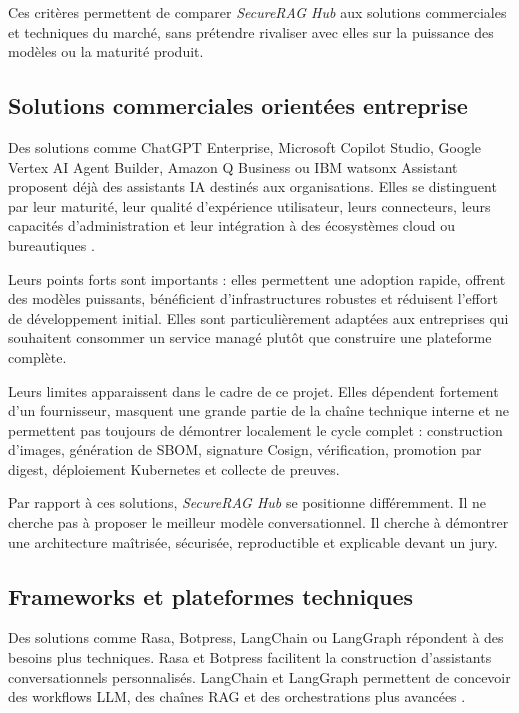 Ces critères permettent de comparer \textit{SecureRAG Hub} aux solutions commerciales et techniques du marché, sans prétendre rivaliser avec elles sur la puissance des modèles ou la maturité produit.

\subsection{Solutions commerciales orientées entreprise}

Des solutions comme ChatGPT Enterprise, Microsoft Copilot Studio, Google Vertex AI Agent Builder, Amazon Q Business ou IBM watsonx Assistant proposent déjà des assistants IA destinés aux organisations. Elles se distinguent par leur maturité, leur qualité d'expérience utilisateur, leurs connecteurs, leurs capacités d'administration et leur intégration à des écosystèmes cloud ou bureautiques \cite{openai_chatgpt_enterprise,microsoft_copilot_studio,google_vertex_ai_agent_builder,aws_q_business,ibm_watsonx_assistant}.

Leurs points forts sont importants : elles permettent une adoption rapide, offrent des modèles puissants, bénéficient d'infrastructures robustes et réduisent l'effort de développement initial. Elles sont particulièrement adaptées aux entreprises qui souhaitent consommer un service managé plutôt que construire une plateforme complète.

Leurs limites apparaissent dans le cadre de ce projet. Elles dépendent fortement d'un fournisseur, masquent une grande partie de la chaîne technique interne et ne permettent pas toujours de démontrer localement le cycle complet : construction d'images, génération de SBOM, signature Cosign, vérification, promotion par digest, déploiement Kubernetes et collecte de preuves.

Par rapport à ces solutions, \textit{SecureRAG Hub} se positionne différemment. Il ne cherche pas à proposer le meilleur modèle conversationnel. Il cherche à démontrer une architecture maîtrisée, sécurisée, reproductible et explicable devant un jury.

\subsection{Frameworks et plateformes techniques}

Des solutions comme Rasa, Botpress, LangChain ou LangGraph répondent à des besoins plus techniques. Rasa et Botpress facilitent la construction d'assistants conversationnels personnalisés. LangChain et LangGraph permettent de concevoir des workflows LLM, des chaînes RAG et des orchestrations plus avancées \cite{rasa_docs,botpress_docs,langchain_docs,langgraph_docs}.

